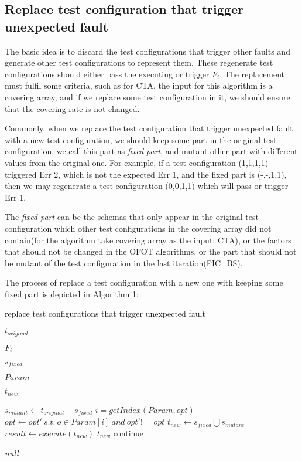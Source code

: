 \documentclass{sig-alternate}
\begin{document}
\subsection{Replace test configuration that trigger unexpected fault}

The basic idea is to discard the test configurations that trigger other faults and generate other test configurations to represent them. These regenerate test configurations should either pass the executing or trigger $F_{i}$.  The replacement must fulfil some criteria, such as for CTA, the input for this algorithm is a covering array, and if we replace some test configuration in it, we should ensure that the covering rate is not changed.

Commonly, when we replace the test configuration that trigger unexpected fault with a new test configuration, we should keep some part in the original test configuration, we call this part as \emph{fixed part}, and mutant other part with different values from the original one. For example, if a test configuration (1,1,1,1) triggered Err 2, which is not the expected Err 1, and the fixed part is (-,-,1,1), then we may regenerate a test configuration (0,0,1,1) which will pass or trigger Err 1.

The \emph{fixed part} can be the schemas that only appear in the original test configuration which other test configurations in the covering array did not contain(for the algorithm take covering array as the input: CTA), or the factors that should not be changed in the OFOT algorithms, or the part that should not be mutant of the test configuration in the last iteration(FIC\_BS).

The process of replace a test configuration with a new one with keeping some fixed part is depicted in Algorithm 1:

\begin{algorithm}
  \caption{replace test configurations that trigger unexpected fault}
  \begin{algorithmic}[1]
     \Require

     $t_{original}$ 

     $F_{i}$ 

     $s_{fixed}$ 

     $Param$ 


     \Ensure  $t_{new}$ 

       \State $s_{mutant} \leftarrow t_{original} - s_{fixed}$
          \State $i = getIndex(Param,opt) $
          \State $opt \leftarrow opt' \ s.t.\ o \in Param[i]\ and\ opt' != opt$
       \EndFor
       \State $t_{new} \leftarrow s_{fixed} \bigcup s_{mutant} $
       \State $result \leftarrow execute(t_{new})$
         \State \Return $t_{new}$
       \Else
         \State continue
       \EndIf
     \EndWhile

     \State \Return \emph{null}
  \end{algorithmic}
\end{algorithm}
\end{document}
